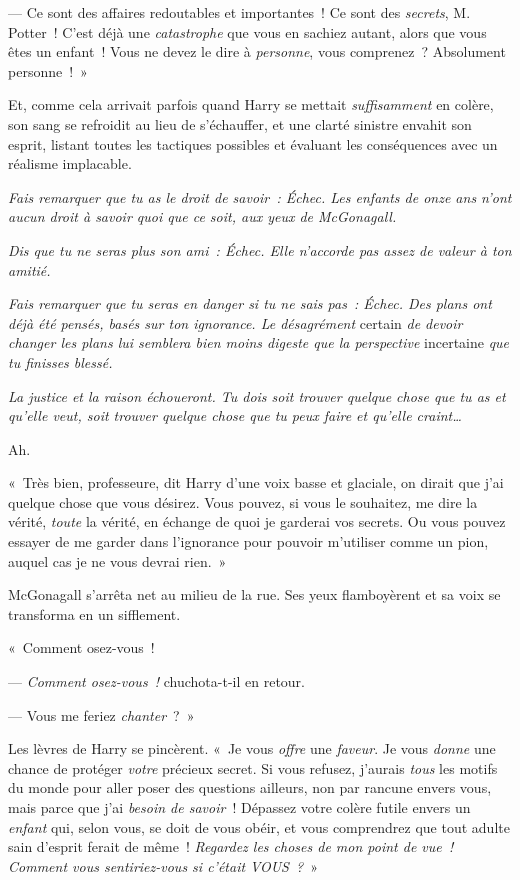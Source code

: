 --- Ce sont des affaires redoutables et importantes~! Ce sont des \emph{secrets}, M. Potter~!
C'est déjà une \emph{catastrophe} que vous en sachiez autant, alors que vous êtes un enfant~!
Vous ne devez le dire à \emph{personne}, vous comprenez~? Absolument personne~!~»

Et, comme cela arrivait parfois quand Harry se mettait \emph{suffisamment} en colère, son sang se refroidit au lieu de s'échauffer, et une clarté sinistre envahit son esprit, listant toutes les tactiques possibles et évaluant les conséquences avec un réalisme implacable.

\emph{Fais remarquer que tu as le droit de savoir~: Échec. Les enfants de onze ans n'ont aucun droit à savoir quoi que ce soit, aux yeux de McGonagall.}

\emph{Dis que tu ne seras plus son ami~: Échec. Elle n'accorde pas assez de valeur à ton amitié.}

\emph{Fais remarquer que tu seras en danger si tu ne sais pas~: Échec.
Des plans ont déjà été pensés, basés sur ton ignorance.
Le désagrément} certain \emph{de devoir changer les plans lui semblera bien moins digeste que la perspective} incertaine \emph{que tu finisses blessé.}

\emph{La justice et la raison échoueront. Tu dois soit trouver quelque chose que tu as et qu'elle veut, soit trouver quelque chose que tu peux faire et qu'elle craint…}

Ah.

«~Très bien, professeure, dit Harry d'une voix basse et glaciale, on dirait que j'ai quelque chose que vous désirez.
Vous pouvez, si vous le souhaitez, me dire la vérité, \emph{toute} la vérité, en échange de quoi je garderai vos secrets.
Ou vous pouvez essayer de me garder dans l'ignorance pour pouvoir m'utiliser comme un pion, auquel cas je ne vous devrai rien.~»

McGonagall s'arrêta net au milieu de la rue. Ses yeux flamboyèrent et sa voix se transforma en un sifflement.

«~Comment osez-vous~!

--- \emph{Comment osez-vous~!} chuchota-t-il en retour.

--- Vous me feriez \emph{chanter}~?~»

Les lèvres de Harry se pincèrent.
«~Je vous \emph{offre} une \emph{faveur}. Je vous \emph{donne} une chance de protéger \emph{votre} précieux secret.
Si vous refusez, j'aurais \emph{tous} les motifs du monde pour aller poser des questions ailleurs, non par rancune envers vous, mais parce que j'ai \emph{besoin de savoir}~!
Dépassez votre colère futile envers un \emph{enfant} qui, selon vous, se doit de vous obéir, et vous comprendrez que tout adulte sain d'esprit ferait de même~!
\emph{Regardez les choses de mon point de vue~! Comment vous sentiriez-vous si c'était VOUS~?}~»

